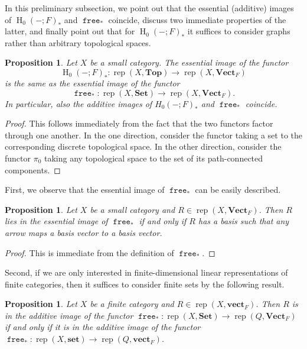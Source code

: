\documentclass[a4paper]{amsart}
\theoremstyle{plain}
\newtheorem{proposition}[theorem]{Proposition}
\theoremstyle{definition}
\theoremstyle{remark}
\newcommand{\funct}[1]{\operatorname{\mathtt{#1}}}
\newcommand{\Top}{\mathbf{Top}}
\newcommand{\Set}{\mathbf{Set}}
\newcommand{\set}{\mathbf{set}}
\newcommand{\VectF}{\mathbf{Vect}_F}
\newcommand{\vectF}{\mathbf{vect}_F}
\DeclareMathOperator{\rep}{rep}
\begin{document}
In this preliminary subsection, we point out that the essential (additive) images of \( \operatorname{H}_0(-; F)_* \) and \( \funct{free}_* \) coincide, discuss two immediate properties of the latter, and finally point out that for \( \operatorname{H}_0(-;F)_* \) it suffices to consider graphs rather than arbitrary topological spaces.

\begin{proposition}
\label{prop.H0Free}
Let $X$ be a small category. The essential image of the functor \[ \operatorname{H}_0(-; F)_* \colon \rep(X, \Top ) \to \rep(X, \VectF) \] is the same as the essential image of the functor \[ \funct{free}_* \colon \rep(X, \Set ) \to \rep(X, \VectF). \]
In particular, also the additive images of ${H}_0(-; F)_*$ and $\funct{free}_*$ coincide.
\end{proposition}
\begin{proof}
This follows immediately from the fact that the two functors factor through one another. In the one direction, consider the functor taking a set to the corresponding discrete topological space. In the other direction, consider the functor $\pi_0$ taking any topological space to the set of its path-connected components. 
\end{proof}

First, we observe that the essential image of $\funct{free}_*$ can be easily described.
\begin{proposition}
\label{prop:free-mult-basis}
Let $X$ be a small category and \( R \in \rep(X, \VectF ) \). Then \( R \) lies in the essential image of \( \funct{free}_* \) if and only if \( R \) has a basis such that any arrow maps a basis vector to a basis vector.
\end{proposition}
\begin{proof}
This is immediate from the definition of $\funct{free}_*$.
\end{proof}

Second, if we are only interested in finite-dimensional linear representations of finite categories, then it suffices to consider finite sets by the following result.

\begin{proposition} 
\label{prop.repinfsets}
Let $X$ be a finite category and \( R \in \rep(X, \vectF) \). Then $R$ is in the additive image of the functor \( \funct{free}_* \colon \rep(X, \Set) \to \rep(Q, \VectF) \) if and only if it is in the additive image of the functor \( \funct{free}_* \colon \rep(X, \set) \to \rep(Q, \vectF) \).
\end{proposition}
\end{document}
